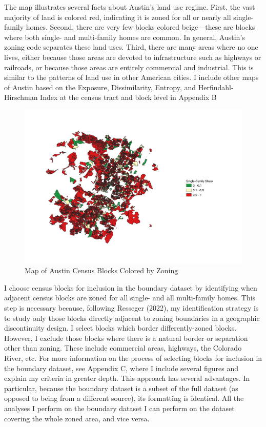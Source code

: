 \documentclass[11pt]{article}
\begin{document}
The map illustrates several facts about Austin's land use regime. First, the vast majority of land is colored red, indicating it is zoned for all or nearly all single-family homes. Second, there are very few blocks colored beige---these are blocks where both single- and multi-family homes are common. In general, Austin's zoning code separates these land uses. Third, there are many areas where no one lives, either because those areas are devoted to infrastructure such as highways or railroads, or because those areas are entirely commercial and industrial. This is similar to the patterns of land use in other American cities. I include other maps of Austin based on the Exposure, Dissimilarity, Entropy, and Herfindahl-Hirschman Index at the census tract and block level in Appendix B

\begin{figure}
    \centering
\includegraphics[width=\textwidth]{fig1_redone_output.pdf}
    \caption{Map of Austin Census Blocks Colored by Zoning}
    \label{fig:Austin_Zoning_Map}
\end{figure}

I choose census blocks for inclusion in the boundary dataset by identifying when adjacent census blocks are zoned for all single- and all multi-family homes. This step is necessary because, following Resseger (2022), my identification strategy is to study only those blocks directly adjacent to zoning boundaries in a geographic discontinuity design. I select blocks which border differently-zoned blocks. However, I exclude those blocks where there is a natural border or separation other than zoning. These include commercial areas, highways, the Colorado River, etc. For more information on the process of selecting blocks for inclusion in the boundary dataset, see Appendix C, where I include several figures and explain my criteria in greater depth. This approach has several advantages. In particular, because the boundary dataset is a subset of the full dataset (as opposed to being from a different source), its formatting is identical. All the analyses I perform on the boundary dataset I can perform on the dataset covering the whole zoned area, and vice versa.
\end{document}
